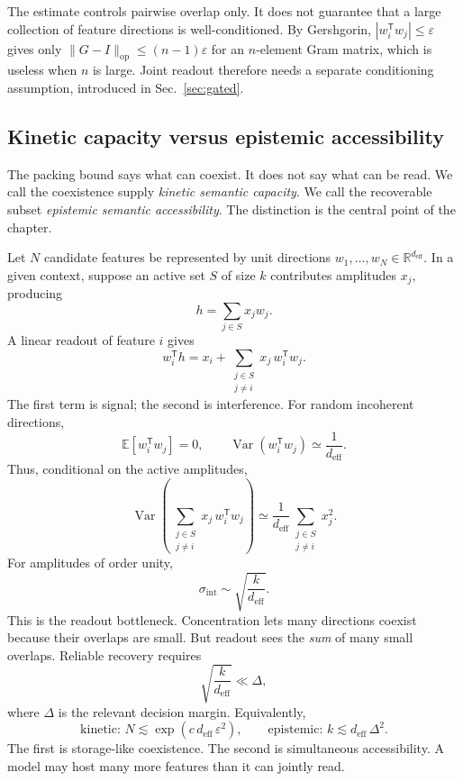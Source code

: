 \documentclass[
  aps,
  reprint,
  superscriptaddress,
  floatfix,
  nofootinbib,
  longbibliography
]{revtex4-2}
\newcommand{\R}{\mathbb{R}}
\newcommand{\E}{\mathbb{E}}
\newcommand{\deff}{d_{\mathrm{eff}}}
\newcommand{\sint}{\sigma_{\mathrm{int}}}
\newcommand{\T}{^{\mathsf{T}}}
\newcommand{\opnorm}[1]{\lVert #1 \rVert_{\mathrm{op}}}
\DeclareMathOperator{\Var}{Var}
\begin{document}
The estimate controls pairwise overlap only. It does not guarantee that
a large collection of feature directions is well-conditioned. By Gershgorin,
$|w_i\T w_j|\le\varepsilon$ gives only
$\opnorm{G-I}\le(n-1)\varepsilon$ for an $n$-element Gram matrix, which
is useless when $n$ is large. Joint readout therefore needs a
separate conditioning assumption, introduced in Sec.~\ref{sec:gated}.

\subsection{Kinetic capacity versus epistemic accessibility}
\label{sec:kinetic-epistemic}

The packing bound says what can coexist. It does not say what can be
read. We call the coexistence supply \emph{kinetic semantic capacity}.
We call the recoverable subset \emph{epistemic semantic accessibility}.
The distinction is the central point of the chapter.

Let $N$ candidate features be represented by unit directions
$w_1,\dots,w_N\in\R^{\deff}$. In a given context, suppose an active set
$S$ of size $k$ contributes amplitudes $x_j$, producing
%
\begin{equation}
\label{eq:hidden}
h=\sum_{j\in S}x_j w_j .
\end{equation}
%
A linear readout of feature $i$ gives
%
\begin{equation}
\label{eq:readout}
w_i\T h
=
x_i+
\sum_{\substack{j\in S\\ j\neq i}}
x_j\,w_i\T w_j .
\end{equation}
%
The first term is signal; the second is interference. For random
incoherent directions,
%
\begin{equation}
\label{eq:moments}
\E[w_i\T w_j]=0,
\qquad
\Var(w_i\T w_j)\simeq \frac{1}{\deff}.
\end{equation}
%
Thus, conditional on the active amplitudes,
%
\begin{equation}
\label{eq:intvar}
\Var\!\left(
\sum_{\substack{j\in S\\ j\neq i}}
x_j\,w_i\T w_j
\right)
\simeq
\frac{1}{\deff}
\sum_{\substack{j\in S\\ j\neq i}}x_j^2 .
\end{equation}
%
For amplitudes of order unity,
%
\begin{equation}
\label{eq:sint}
\sint\sim\sqrt{\frac{k}{\deff}} .
\end{equation}
%
This is the readout bottleneck. Concentration lets many directions
coexist because their overlaps are small. But readout sees the
\emph{sum} of many small overlaps. Reliable recovery requires
%
\begin{equation}
\label{eq:snr}
\sqrt{\frac{k}{\deff}}\ll \Delta,
\end{equation}
%
where $\Delta$ is the relevant decision margin. Equivalently,
%
\begin{equation}
\label{eq:dual}
\text{kinetic: }N\lesssim\exp(c\,\deff\,\varepsilon^{2}),
\qquad
\text{epistemic: }k\lesssim\deff\,\Delta^{2}.
\end{equation}
%
The first is storage-like coexistence. The second is simultaneous
accessibility. A model may host many more features than it can jointly
read.
\end{document}
